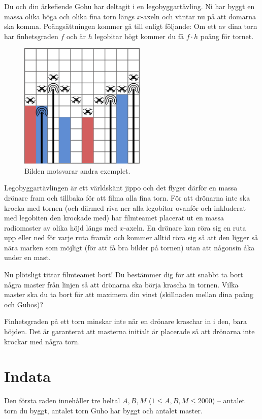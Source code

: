 Du och din ärkefiende Gohu har deltagit i en legobyggartävling.
Ni har byggt en massa olika höga och olika fina torn längs $x$-axeln och väntar nu på att domarna ska komma.
Poängsättningen kommer gå till enligt följande: Om ett av dina torn har finhetsgraden $f$ och är $h$ legobitar högt kommer du få $f\cdot h$ poäng för tornet.

\begin{figure}[!h]
  \centering
  \includegraphics[width=6cm]{sample}
  \caption{Bilden motsvarar andra exemplet.}
\end{figure}

Legobyggartävlingen är ett världskänt jippo och det flyger därför en massa drönare fram och tillbaka för att filma alla fina torn.
För att drönarna inte ska krocka med tornen (och därmed riva ner alla legobitar ovanför och inkluderat med legobiten den krockade med) har filmteamet placerat ut en massa radiomaster av olika höjd längs med $x$-axeln.
En drönare kan röra sig en ruta upp eller ned för varje ruta framåt och kommer alltid röra sig så att den ligger så nära marken som möjligt (för att få bra bilder på tornen) utan att någonsin åka under en mast.

Nu plötsligt tittar filmteamet bort!
Du bestämmer dig för att snabbt ta bort några master från linjen så att drönarna ska börja krascha in tornen.
Vilka master ska du ta bort för att maximera din vinst (skillnaden mellan dina poäng och Guhos)?

Finhetsgraden på ett torn minskar inte när en drönare kraschar in i den, bara höjden.
Det är garanterat att masterna initialt är placerade så att drönarna inte krockar med några torn.


\section*{Indata}
Den första raden innehåller tre heltal $A,B,M$ ($1 \leq A,B,M \leq 2000$) -- antalet torn du byggt, antalet torn Guho har byggt och antalet master.

